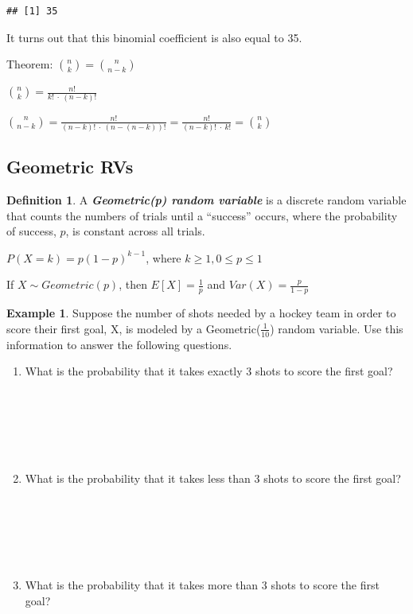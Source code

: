 \documentclass[
  11pt,
]{book}
\theoremstyle{definition}
\newtheorem{definition}{Definition}[chapter]
\theoremstyle{definition}
\newtheorem{example}{Example}[chapter]
\theoremstyle{definition}
\theoremstyle{definition}
\theoremstyle{remark}
\begin{document}
\begin{verbatim}
## [1] 35
\end{verbatim}

It turns out that this binomial coefficient is also equal to 35.

Theorem: \(\binom{n}{k} = \binom{n}{n-k}\)

\(\binom{n}{k} = \frac{n!}{k!\ \cdot\ (n-k)!}\)

\(\binom{n}{n-k} = \frac{n!}{(n-k)!\ \cdot\ (n-(n-k))!} = \frac{n!}{(n-k)!\ \cdot\ k!} = \binom{n}{k}\)

\newpage

\hypertarget{geometric-rvs}{%
\subsection{Geometric RVs}\label{geometric-rvs}}

\begin{definition}
A \textbf{\emph{Geometric(p) random variable}} is a discrete random variable that counts the numbers of trials until a ``success'' occurs, where the probability of success, \(p\), is constant across all trials.

\(P(X=k) = p(1-p)^{k-1}\), where \(k \geq 1, 0 \leq p \leq 1\)

If \(X \sim Geometric(p)\), then \(E[X]=\frac{1}{p}\) and \(Var(X)=\frac{p}{1-p}\)
\end{definition}

\begin{example}
Suppose the number of shots needed by a hockey team in order to score their first goal, X, is modeled by a Geometric(\(\frac{1}{10}\)) random variable. Use this information to answer the following questions.
\end{example}

\begin{enumerate}
\def\labelenumi{(\alph{enumi})}
\item
  What is the probability that it takes exactly 3 shots to score the first goal?\\
  \strut \\
  \strut \\
  \strut \\
\item
  What is the probability that it takes less than 3 shots to score the first goal?\\
  \strut \\
  \strut \\
  \strut \\
\item
  What is the probability that it takes more than 3 shots to score the first goal?\\
  \strut \\
  \strut \\
  \strut \\
\end{enumerate}
\end{document}
